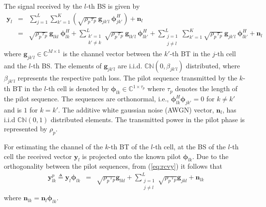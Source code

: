 \documentclass[10pt, a4paper, twoside,fleqn]{article}
\begin{document}
The signal received by the $l$-th BS is given by
\begin{eqnarray}\label{eq:rcvy}
	\pmb{y}_{l} &=& \sum_{j=1}^{L} \sum_{k'=1}^{K} \left(\sqrt{\rho_p \tau_p} \ \pmb{g}_{jk'l} \ \pmb{\phi}^H_{jk'}\right)
        		    +  \pmb{n}_{l} \nonumber \\                    
    			   &=& \sqrt{\rho_p \tau_p} \ \pmb{g}_{lkl} \ \pmb{\phi}^H_{lk}
        			+  \sum_{\substack{k'=1 \\ k' \neq k}}^{L} \sqrt{\rho_p \tau_p} \ \pmb{g}_{lk'l} \ \pmb{\phi}^H_{lk'}
        		    +  \sum_{\substack{j=1 \\ j \neq l}}^{L} \sum_{k'=1}^{K} \sqrt{\rho_p \tau_p} \
                       \pmb{g}_{jk'l} \ \pmb{\phi}^H_{lk'}
    			    +  \pmb{n}_{l}
\end{eqnarray}
where $\pmb{g}_{jk'l} \in {\mathbb C}^{M \times 1}$ is the channel vector between the $k'$-th BT in the $j$-th cell and the $l$-th BS. The elements of $\pmb{g}_{jk'l}$ are i.i.d. ${\mathbb C}{\mathbb N}(0, \beta_{jk'l})$ distributed, where $\beta_{jk'l}$ represents the respective path loss. The pilot sequence transmitted by the $k$-th BT in the $l$-th cell is denoted by $\pmb{\phi}_{lk} \in {\mathbb C}^{1 \times \tau_p}$ where $\tau_p$ denotes the length of the pilot sequence. The sequences are orthonormal, i.e., $\pmb{\phi}_{lk}^H \pmb{\phi}_{jk'} = 0$ for  $k \ne k'$ and is $1$ for $k=k'$. The additive white gaussian noise (AWGN) vector, $\pmb{n}_l$, has i.i.d ${\mathbb C}{\mathbb N}(0,1)$ distributed elements. The transmitted power in the pilot phase is represented by $\rho_p$.

For estimating the channel of the $k$-th BT of the $l$-th cell, at the BS of the $l$-th cell the received vector $\pmb{y}_{l}$ is projected onto the known pilot $\pmb{\phi}_{lk}$. Due to the orthogonality between the pilot sequences, from (\ref{eq:rcvy}) it follows that
\begin{eqnarray}\label{eqn:ylkp}
	\pmb{y}_{lk}^{p} \triangleq \pmb{y}_{l} \pmb{\phi}_{lk}
                          &=&     \sqrt{\rho_p\tau_p}\pmb{g}_{lkl}
                           +      \sum_{\substack{j=1 \\ j \neq l}}^{L} \sqrt{\rho_p\tau_p}\pmb{g}_{jkl}
             			   +      \pmb{n}_{lk}
\end{eqnarray}
where $\pmb{n}_{lk} = \pmb{n}_{l}\pmb{\phi}_{lk}$.
\end{document}
